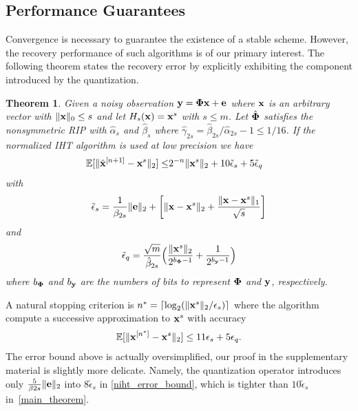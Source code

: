 \documentclass{article}
\newtheorem{theorem}{Theorem}
\begin{document}
\subsection{Performance Guarantees}
Convergence is necessary to guarantee the existence of a stable scheme. However, the recovery performance of such algorithms is of our primary interest. The following theorem states the recovery error by explicitly exhibiting the component introduced by the quantization.
\begin{theorem}\label{main_theorem_TH}
Given a noisy observation ${\bf y} = {\bf \Phi x}+{\bf e} $ where ${\bf x}$ is an arbitrary vector with $\|{\bf x} \|_0 \leq s$ and let $H_s({\bf x}) = {\bf x}^s$ with $s\leq m$. Let $\hat{\bf \Phi}$ satisfies the nonsymmetric RIP with $\hat{\alpha}_s$ and $\hat{\beta}_s$ where $\hat{\gamma}_{2s} = \hat{\beta}_{2s}/\hat{\alpha}_{2s} -1 \leq 1/16$. If the normalized IHT algorithm is used at low precision we have
\begin{equation}\label{main_theorem}
\begin{split}
        \mathbb{E}[\|\hat{{\bf x}}^{[n+1]}-{\bf x}^s\|_2]  
        \leq &2^{-n}\|{\bf x}^{s}\|_2  + 10\tilde{\epsilon}_s + 5\tilde{\epsilon}_q
\end{split}
\end{equation}
with 
\begin{equation}
\tilde{\epsilon}_s = \frac{1}{\beta_{2s}}\|{\bf e} \|_2 +\bigg  [ \|{\bf x}-{\bf x}^s \|_2 + \frac{\|{\bf x}-{\bf x}^s \|_1}{\sqrt{s}}\bigg]    
\end{equation}
and
\begin{equation}
\tilde{\epsilon}_q = \frac{\sqrt{m}}{\hat{\beta}_{2s}}\Big ( \frac{\| {\bf x}^s\|_2}{2^{b_{\bf \Phi}-1}}+\frac{1}{2^{b_{\bf y}-1}} \Big )
\end{equation}
where $b_{\bf \Phi}$ and $b_{\bf y}$ are the numbers of bits to represent ${\bf \Phi}$ and ${\bf y}$, respectively.
\end{theorem}

A natural stopping criterion is $n^* = \lceil \log_2 (\|{\bf x}^s \|_2/\epsilon_s)\rceil$ where the algorithm compute a successive approximation to ${\bf x}^s$ with accuracy
\begin{equation}
    \mathbb{E}[\|{\bf x}^{[n^*]}-{\bf x}^s \|_2] \leq 11\epsilon_s + 5\epsilon_q.
\end{equation}
The error bound above is actually oversimplified, our proof in the supplementary material is slightly more delicate. Namely, the quantization operator introduces only $\frac{5}{\beta
{2s}} \|{\bf e} \|_2$ into $8\tilde{\epsilon}_s$ in \ref{niht_error_bound}, which is tighter than $10\tilde{\epsilon}_s$ in~\ref{main_theorem}.
\end{document}
